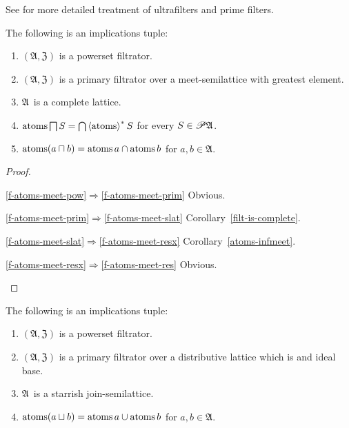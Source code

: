 See \cite{primeidealsandfilters,primefilters} for more detailed treatment
of ultrafilters and prime filters.

\begin{prop}
The following is an implications tuple:
\begin{enumerate}
\item\label{f-atoms-meet-pow} $(\mathfrak{A},\mathfrak{Z})$ is a powerset filtrator.
\item\label{f-atoms-meet-prim} $(\mathfrak{A},\mathfrak{Z})$
  is a primary filtrator over a meet-semilattice with greatest element.
\item\label{f-atoms-meet-slat} $\mathfrak{A}$~is a complete lattice.
\item\label{f-atoms-meet-resx} $\operatorname{atoms}\bigsqcap S=\bigcap\left\langle \operatorname{atoms}\right\rangle ^{\ast}S$ for every $S\in\mathscr{P}\mathfrak{A}$.
\item\label{f-atoms-meet-res} $\operatorname{atoms}(a\sqcap b)=\operatorname{atoms} a\cap\operatorname{atoms} b$ for $a,b\in\mathfrak{A}$.
\end{enumerate}
\end{prop}

\begin{proof}
~
\begin{disorder}
\item[\ref{f-atoms-meet-pow}$\Rightarrow$\ref{f-atoms-meet-prim}] Obvious.
\item[\ref{f-atoms-meet-prim}$\Rightarrow$\ref{f-atoms-meet-slat}] Corollary~\ref{filt-is-complete}.
\item[\ref{f-atoms-meet-slat}$\Rightarrow$\ref{f-atoms-meet-resx}] Corollary~\ref{atoms-infmeet}.
\item[\ref{f-atoms-meet-resx}$\Rightarrow$\ref{f-atoms-meet-res}] Obvious.
\end{disorder}
\end{proof}

\begin{prop}
The following is an implications tuple:
\begin{enumerate}
\item\label{f-atoms-join-pow} $(\mathfrak{A},\mathfrak{Z})$ is a powerset filtrator.
\item\label{f-atoms-join-prim} $(\mathfrak{A},\mathfrak{Z})$
  is a primary filtrator over a distributive lattice
  which is and ideal base.
\item\label{f-atoms-join-slat} $\mathfrak{A}$~is a starrish join-semilattice.
\item\label{f-atoms-join-res} $\operatorname{atoms}(a\sqcup b)=\operatorname{atoms} a\cup\operatorname{atoms} b$ for $a,b\in\mathfrak{A}$.
\end{enumerate}
\end{prop}

